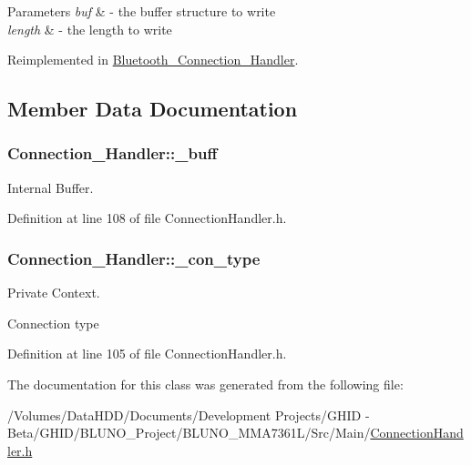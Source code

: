 \begin{DoxyParams}{\-Parameters}
{\em buf} & -\/ the buffer structure to write \\
\hline
{\em length} & -\/ the length to write \\
\hline
\end{DoxyParams}


\-Reimplemented in \hyperlink{class_bluetooth___connection___handler_a5970fc3699bcd204f256b4e9e31b4dcb}{\-Bluetooth\-\_\-\-Connection\-\_\-\-Handler}.



\subsection{\-Member \-Data \-Documentation}
\hypertarget{class_connection___handler_ad1eca58f0f8cb43147ce961389293b37}{
\subsubsection[{\-\_\-buff}]{ {\bf \-Connection\-\_\-\-Handler\-::\-\_\-buff}}}\label{class_connection___handler_ad1eca58f0f8cb43147ce961389293b37}


\-Internal \-Buffer. 



\-Definition at line 108 of file \-Connection\-Handler.\-h.

\hypertarget{class_connection___handler_a3ac7a0346fb72ae55ffa867465e397f2}{
\subsubsection[{\-\_\-con\-\_\-type}]{ {\bf \-Connection\-\_\-\-Handler\-::\-\_\-con\-\_\-type}}}\label{class_connection___handler_a3ac7a0346fb72ae55ffa867465e397f2}


\-Private \-Context. 

\-Connection type 

\-Definition at line 105 of file \-Connection\-Handler.\-h.



\-The documentation for this class was generated from the following file\-:\begin{DoxyCompactItemize}
\item 
/\-Volumes/\-Data\-H\-D\-D/\-Documents/\-Development Projects/\-G\-H\-I\-D -\/ Beta/\-G\-H\-I\-D/\-B\-L\-U\-N\-O\-\_\-\-Project/\-B\-L\-U\-N\-O\-\_\-\-M\-M\-A7361\-L/\-Src/\-Main/\hyperlink{_connection_handler_8h}{\-Connection\-Handler.\-h}\end{DoxyCompactItemize}
